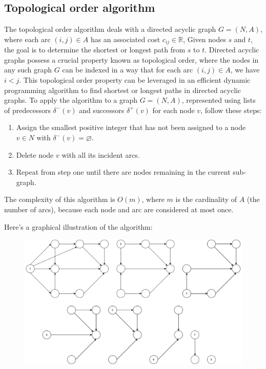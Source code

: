 \subsection{Topological order algorithm}
The topological order algorithm deals with a directed acyclic graph $G = (N,A)$, where each arc $(i,j) \in A$ has an associated cost $c_{ij} \in \mathbb{R}$, 
Given nodes $s$ and $t$, the goal is to determine the shortest or longest path from $s$ to $t$.
Directed acyclic graphs possess a crucial property known as topological order, where the nodes in any such graph $G$ can be indexed in a way that for each arc $(i, j) \in A$, we have $i < j$. 
This topological order property can be leveraged in an efficient dynamic programming algorithm to find shortest or longest paths in directed acyclic graphs.
To apply the algorithm to a graph $G = (N,A)$, represented using lists of predecessors $\delta^{-}(v)$ and successors $\delta^{+}(v)$ for each node $v$, follow these steps:
\begin{enumerate}
    \item Assign the smallest positive integer that has not been assigned to a node $v \in N$ with $\delta^{-}(v)=\varnothing$. 
    \item Delete node $v$ with all its incident arcs.
    \item Repeat from step one until there are nodes remaining in the current sub-graph.
\end{enumerate}
The complexity of this algorithm is $O(m)$, where $m$ is the cardinality of $A$ (the number of arcs), because each node and arc are considered at most once.
\begin{example}
    Here's a graphical illustration of the algorithm:
    \begin{figure}[H]
        \centering
        \includegraphics[width=0.8\linewidth]{images/spath.png}
    \end{figure}
\end{example}


